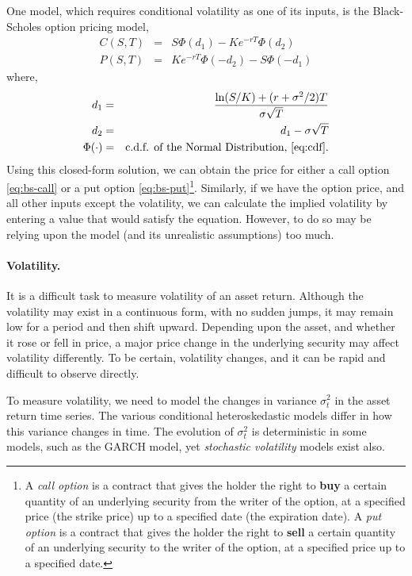 One model, which requires conditional volatility as one of its inputs, is the Black-Scholes option pricing model,
\begin{subequations}
	\begin{eqnarray}
	C(S,T) &=& S\Phi(d_1) - Ke^{-rT}\Phi(d_2) \label{eq:bs-call} \\
	P(S,T) &=& Ke^{-rT}\Phi(-d_2) - S\Phi(-d_1) \label{eq:bs-put}
	\end{eqnarray}
\end{subequations}
where,
\begin{eqnarray*}
d_1 &=& \frac{\ln(S/K) + (r + \sigma^2/2)T}{\sigma\sqrt{T}} \notag \\
d_2 &=& d_1 - \sigma\sqrt{T} \notag \\
\Phi(\cdot) &=& \text{c.d.f. of the Normal Distribution, \eqref{eq:cdf}}. \notag
\end{eqnarray*}
Using this closed-form solution, we can obtain the price for either a call option \eqref{eq:bs-call} or a put option \eqref{eq:bs-put}\footnote{A \emph{call option} is a contract that gives the holder the right to \textbf{buy} a certain quantity of an underlying security from the writer of the option, at a specified price (the strike price) up to a specified date (the expiration date). 
A \emph{put option} is a contract that gives the holder the right to \textbf{sell} a certain quantity of an underlying security to the writer of the option, at a specified price up to a specified date.
}.
Similarly, if we have the option price, and all other inputs except the volatility, we can calculate the implied volatility by entering a value that would satisfy the equation. However, to do so may be relying upon the model (and its unrealistic assumptions) too much.

\paragraph{Volatility.} It is a difficult task to measure volatility of an asset return. Although the volatility may exist in a continuous form, with no sudden jumps, it may remain low for a period and then shift upward. Depending upon the asset, and whether it rose or fell in price, a major price change in the underlying security may affect volatility differently. To be certain, volatility changes, and it can be rapid and difficult to observe directly.

To measure volatility, we need to model the changes in variance $\sigma^2_t$ in the asset return time series. The various conditional heteroskedastic models differ in how this variance changes in time. The evolution of $\sigma^2_t$ is deterministic in some models, such as the GARCH model, yet \emph{stochastic volatility} models exist also.

